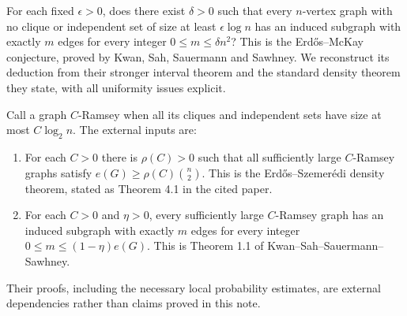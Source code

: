 For each fixed $\epsilon>0$, does there exist $\delta>0$ such that
every $n$-vertex graph with no clique or independent set of size
at least $\epsilon\log n$ has an induced subgraph with exactly
$m$ edges for every integer $0\leq m\leq\delta n^2$?
This is the Erd\H{o}s--McKay conjecture, proved by Kwan, Sah,
Sauermann and Sawhney. We reconstruct its deduction from their
stronger interval theorem and the standard density theorem they
state, with all uniformity issues explicit.

Call a graph $C$-Ramsey when all its cliques and independent sets
have size at most $C\log_2 n$. The external inputs are:
\begin{enumerate}
\item For each $C>0$ there is $\rho(C)>0$ such that all sufficiently
large $C$-Ramsey graphs satisfy
$e(G)\geq\rho(C)\binom n2$. This is the Erd\H{o}s--Szemer\'edi
density theorem, stated as Theorem 4.1 in the cited paper.
\item For each $C>0$ and $\eta>0$, every sufficiently large
$C$-Ramsey graph has an induced subgraph with exactly $m$ edges
for every integer $0\leq m\leq(1-\eta)e(G)$.
This is Theorem 1.1 of Kwan--Sah--Sauermann--Sawhney.
\end{enumerate}
Their proofs, including the necessary local probability estimates,
are external dependencies rather than claims proved in this note.
